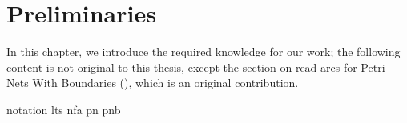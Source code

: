 \chapter{Preliminaries}\label{chp:prelims}

In this chapter, we introduce the required knowledge for our work; the
following content is not original to this thesis, except the section on read
arcs for Petri Nets With Boundaries (), which is
an original contribution.

{notation}
{lts}
{nfa}
{pn}
{pnb}

